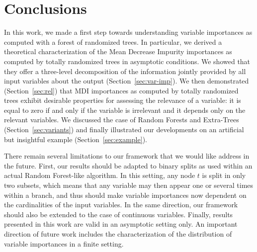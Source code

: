 \documentclass{article}
\begin{document}

\section{Conclusions}
\label{sec:conclusions}

In this work, we made a first step towards understanding variable importances as
computed with a forest of randomized trees. In particular, we derived a
theoretical characterization of the Mean Decrease Impurity importances as
computed by totally randomized trees in asymptotic  conditions.  We showed that
they offer a three-level decomposition of the information jointly provided by
all input variables about the output (Section~\ref{sec:var-imp}). We then demonstrated
(Section~\ref{sec:rel}) that MDI importances as computed by totally randomized
trees exhibit desirable properties for  assessing the relevance of a variable:
it is equal to zero if and only if the variable is irrelevant and it depends
only on the relevant variables. We discussed the case of Random Forests and
Extra-Trees (Section~\ref{sec:variants}) and finally illustrated our
developments on an artificial but insightful example (Section~\ref{sec:example}).

There remain several limitations to our framework that we would like address in
the future. First, our results should be adapted to binary splits as used within
an actual Random Forest-like algorithm. In this setting, any node $t$ is split
in only two subsets, which means that any variable may then appear one or
several times within a branch, and thus should make variable importances now
dependent on the cardinalities of the input variables. In the same direction,
our framework should also be extended to the case of continuous variables.
Finally, results presented in this work are valid in an asymptotic setting only.
An important direction of future work includes the characterization of the
distribution of variable importances in a finite setting.



\clearpage


\vfill
\end{document}
